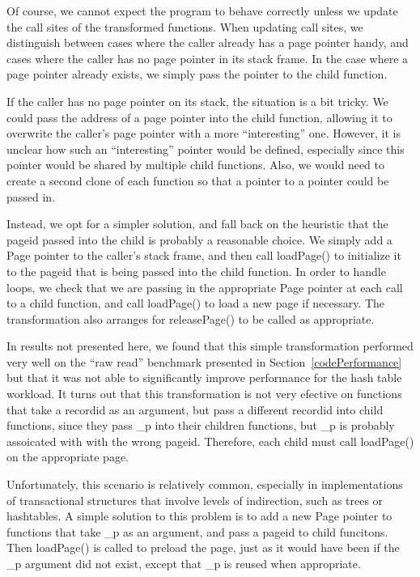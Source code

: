 \documentclass[10pt,letterpaper,twocolumn,english]{article}
\newcommand{\pin}{loadPage()\xspace}
\newcommand{\unpin}{releasePage()\xspace}
\newcommand{\PP}{\_p\xspace}
\begin{document}
Of course, we cannot expect the program to behave correctly unless we
update the call sites of the transformed functions.  When updating
call sites, we distinguish between cases where the caller already has
a page pointer handy, and cases where the caller has no page pointer
in its stack frame.  In the case where a page pointer already exists,
we simply pass the pointer to the child function.

If the caller has no page pointer on its stack, the situation is a bit
tricky.  We could pass the address of a page pointer into the child
function, allowing it to overwrite the caller's page pointer with a
more ``interesting'' one.  However, it is unclear how such an
``interesting'' pointer would be defined, especially since this
pointer would be shared by multiple child functions.  Also, we would need
to create a second clone of each function so that a pointer to a
pointer could be passed in.  

Instead, we opt for a simpler solution, and fall back on the heuristic
that the pageid passed into the child is probably a reasonable choice.
We simply add a Page pointer to the caller's stack frame, and then
call \pin to initialize it to the pageid that is being passed into the
child function.  In order to handle loops, we check that we are
passing in the appropriate Page pointer at each call to a child
function, and call \pin to load a new page if necessary.  The
transformation also arranges for \unpin to be called as appropriate.

In results not presented here, we found that this simple
transformation performed very well on the ``raw read'' benchmark
presented in Section~\ref{codePerformance} but that it was not able to
significantly improve performance for the hash table workload.  It
turns out that this transformation is not very efective on functions
that take a recordid as an argument, but pass a different recordid
into child functions, since they pass \PP into their children
functions, but \PP is probably assoicated with with the wrong pageid.
Therefore, each child must call \pin on the appropriate page. 

Unfortunately, this scenario is relatively common, especially in
implementations of transactional structures that involve levels of
indirection, such as trees or hashtables.  A simple solution to this
problem is to add a new Page pointer to functions that take \PP as an
argument, and pass a pageid to child funcitons.  Then \pin is called
to preload the page, just as it would have been if the \PP argument
did not exist, except that \PP is reused when appropriate.
\end{document}
